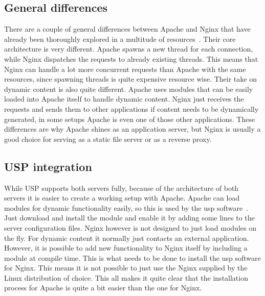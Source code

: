 \documentclass[twoside,openright]{uva-bachelor-thesis}
\begin{document}
\subsection{General differences}
There are a couple of general differences between Apache and Nginx that have
already been thoroughly explored in a multitude of
resources~\autocites{nginx1}{nginx2}{apachevsnginx}{nginxperformancescale}.
Their core architecture is very different. Apache spawns a new thread for each
connection, while Nginx dispatches the requests to already existing threads.
This means that Nginx can handle a lot more concurrent requests than Apache with
the same resources, since spawning threads is quite expensive resource wise.
Their take on dynamic content is also quite different. Apache uses modules that
can be easily loaded into Apache itself to handle dynamic content.  Nginx just
receives the requests and sends them to other applications if content needs to
be dynamically generated, in some setups Apache is even one of those other
applications. These differences are why Apache shines as an application server,
but Nginx is usually a good choice for serving as a static file server or as a
reverse proxy.


\subsection{USP integration}
While USP supports both servers fully, because of the architecture of both
servers it is easier to create a working setup with Apache. Apache can load
modules for dynamic functionality easily, so this is used by the \gls{usp}
software~\autocite{uspapache}. Just download and install the module
and enable it by adding some lines to the server configuration files. Nginx however is
not designed to just load modules on the fly. For dynamic content it normally
just contacts an external application. However, it is possible to add new
functionality to Nginx itself by including a module at compile time. This is
what needs to be done to install the \gls{usp} software for Nginx. This means
it is not possible to just use the Nginx supplied by the Linux distribution of
choice. This all makes it quite clear that the installation process for Apache
is quite a bit easier than the one for Nginx.
\end{document}
